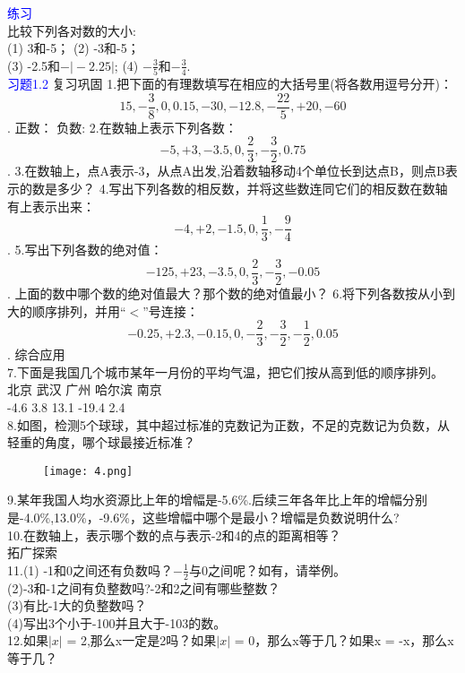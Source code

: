 \documentclass[UTF8]{article}
\begin{document}
	\textcolor{blue}{\heiti 练习}\\
	比较下列各对数的大小:\\
	(1) 3和-5；                        (2) -3和-5；\\
	(3) -2.5和$-\vert -2.25 \vert$;     (4) $-\frac{3}{5}$和$-\frac{3}{4}$.\\
	\textcolor{blue}{\heiti 习题1.2}
	{\heiti 复习巩固}
	1.把下面的有理数填写在相应的大括号里(将各数用逗号分开)：
	$$ 15,-\frac{3}{8},0,0.15,-30,-12.8,-\frac{22}{5},+20,-60 $$.
	正数：${              }$ 负数:$ {               } $
	2.在数轴上表示下列各数：
	$$-5,+3,-3.5,0,\frac{2}{3},-\frac{3}{2},0.75 $$.
	3.在数轴上，点A表示-3，从点A出发,沿着数轴移动4个单位长到达点B，则点B表示的数是多少？
	4.写出下列各数的相反数，并将这些数连同它们的相反数在数轴有上表示出来：
	$$ -4,+2,-1.5,0,\frac{1}{3},-\frac{9}{4} $$.
	5.写出下列各数的绝对值：
	$$-125,+23,-3.5,0,\frac{2}{3},-\frac{3}{2},-0.05$$.
	上面的数中哪个数的绝对值最大？那个数的绝对值最小？
	6.将下列各数按从小到大的顺序排列，并用“$<$”号连接：
	$$-0.25,+2.3,-0.15,0,-\frac{2}{3},-\frac{3}{2},-\frac{1}{2},0.05$$.
	{\heiti 综合应用}\\
	7.下面是我国几个城市某年一月份的平均气温，把它们按从高到低的顺序排列。\\
	北京  武汉  广州  哈尔滨   南京\\
	-4.6{\textcelsius } 3.8{\textcelsius } 13.1{\textcelsius }  -19.4{\textcelsius } 2.4{\textcelsius } \\
	8.如图，检测5个球球，其中超过标准的克数记为正数，不足的克数记为负数，从轻重的角度，哪个球最接近标准？\\
		\begin{figure}[ht]
		\centering
		\texttt{[image: 4.png]}
	\end{figure}
	9.某年我国人均水资源比上年的增幅是-5.6\%.后续三年各年比上年的增幅分别是-4.0\%,13.0\%，-9.6\%，这些增幅中哪个是最小？增幅是负数说明什么?\\
	10.在数轴上，表示哪个数的点与表示-2和4的点的距离相等？\\
	{\heiti 拓广探索}\\
	11.(1) -1和0之间还有负数吗？$-\frac{1}{2}$与0之间呢？如有，请举例。\\
	(2)-3和-1之间有负整数吗?-2和2之间有哪些整数？\\
	(3)有比-1大的负整数吗？\\
	(4)写出3个小于-100并且大于-103的数。\\
	12.如果$\vert x \vert$ = 2,那么x一定是2吗？如果$\vert x \vert$ = 0，那么x等于几？如果x = -x，那么x等于几？\\
\end{document}
